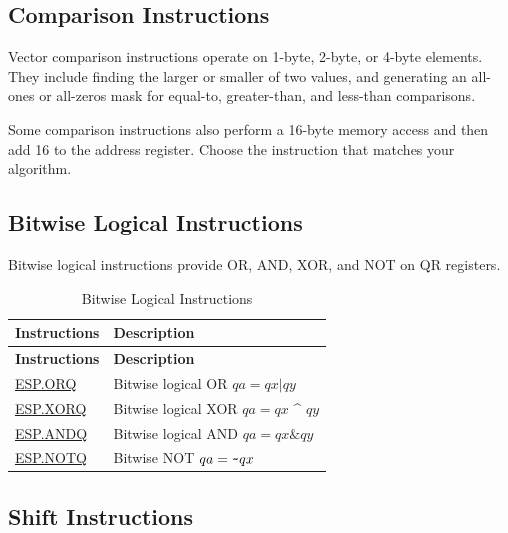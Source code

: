 \documentclass[main\_\_EN.tex]{subfiles}
\begin{document}
\subsection{Comparison Instructions}
\label{sec:pie-comparison-instructions}

Vector comparison instructions operate on 1-byte, 2-byte, or 4-byte elements. They include finding the larger or smaller of two values, and generating an all-ones or all-zeros mask for equal-to, greater-than, and less-than comparisons.

Some comparison instructions also perform a 16-byte memory access and then add 16 to the address register. Choose the instruction that matches your algorithm.




\subsection{Bitwise Logical Instructions}
\label{sec:pie-bitwise-logic-instructions}

Bitwise logical instructions provide OR, AND, XOR, and NOT on QR registers.

\begin{longtable}[c]{|l|m{10cm}|}
    \caption{Bitwise Logical Instructions}
    \label{tab:pie-bitwise-logic-instructions}\\
    \hline
    \rowcolor{lightgray}
    \textbf{Instructions} & \textbf{Description} \\\hline
    \endfirsthead
    \rowcolor{lightgray}
    \textbf{Instructions} & \textbf{Description} \\\hline
    \endhead
    \endfoot

    \hyperref[instruction:ESPORQ]{ESP.ORQ} & Bitwise logical OR $qa = qx | qy$
    \\\hline
    \hyperref[instruction:ESPXORQ]{ESP.XORQ} & Bitwise logical XOR $qa = qx$ \^{} $qy$
    \\\hline
    \hyperref[instruction:ESPANDQ]{ESP.ANDQ} & Bitwise logical AND $qa = qx \& qy$
    \\\hline
    \hyperref[instruction:ESPNOTQ]{ESP.NOTQ} & Bitwise NOT $qa =\verb+~+ qx$
    \\\hline
\end{longtable}

\subsection{Shift Instructions}
\label{sec:pie-shift-instructions}
\end{document}
